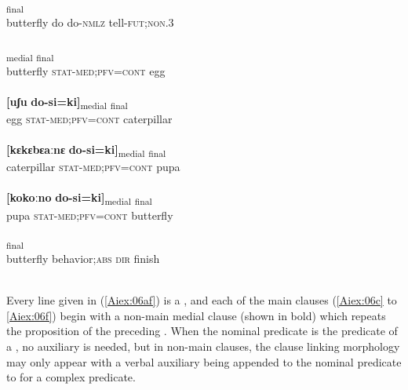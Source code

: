 \documentclass[output=paper]{LSP/langsci}
\begin{document}
\begin{exe}
\ex \label{Aiex:06af}
\begin{xlist}
\ex \label{Aiex:06a}
\textsubscript{final}\\
butterfly do do-\textsc{nmlz} tell-\textsc{fut};\textsc{non}.\textsc{3}\\
\glt {}\\
\ex \label{Aiex:06b}
\gll [ɛjaːgɛ	do-si=ki]\textsubscript{medial} \underline{\smash{[uʃu]}}\textsubscript{final}\\
butterfly \textsc{stat}-\textsc{med};\textsc{pfv}=\textsc{cont} egg\\
\glt {}\\
\ex \label{Aiex:06c}
\gll \textbf{[uʃu}	\textbf{do-si=ki]}\textsubscript{medial}	\underline{\smash{[kɛkɛbɛaːnɛ]}}\textsubscript{final}\\
egg	\textsc{stat}-\textsc{med};\textsc{pfv}=\textsc{cont} caterpillar\\
\glt {}\\
\ex \label{Aiex:06d}
\gll \textbf{[kɛkɛbɛaːnɛ} \textbf{do-si=ki]}\textsubscript{medial} \underline{\smash{[kokoːno]}}\textsubscript{final}\\
caterpillar \textsc{stat}-\textsc{med;}\textsc{pfv}=\textsc{cont} pupa\\
\glt {}\\
\ex \label{Aiex:06e}
\gll \textbf{[kokoːno} \textbf{do-si=ki]}\textsubscript{medial} \underline{\smash{[ɛjaːgɛ]}}\textsubscript{final}\\
pupa \textsc{stat}-\textsc{med};\textsc{pfv}=\textsc{cont} butterfly\\
\glt {}\\
\ex \label{Aiex:06f}
\textsubscript{final}\\
butterfly	behavior;\textsc{abs} \textsc{dir}	finish\\
\glt {}\\
\end{xlist}
\end{exe}

Every line given in (\ref{Aiex:06af}) is a , and each of the main clauses (\ref{Aiex:06c} to \ref{Aiex:06f}) begin with a non-main medial
clause (shown in bold) which repeats the proposition of the preceding . When the nominal
predicate is the predicate of a , no auxiliary is needed, but in non-main clauses, the clause
linking morphology may only appear with a verbal auxiliary being appended to the nominal predicate to
for a complex predicate.
\end{document}
